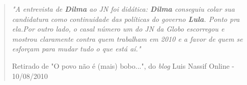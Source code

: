 \begin{quote}
\emph{"A entrevista de \textbf{Dilma} ao JN foi didática: \textbf{Dilma} conseguiu colar sua candidatura como continuidade das políticas do governo \textbf{Lula}. Ponto pra ela.Por outro lado, o casal número um do JN da Globo escorregou e mostrou claramente contra quem trabalham em 2010 e a favor de quem se esforçam para mudar tudo o que está aí."}

{\small Retirado de "O povo não é (mais) bobo...", do \emph{blog} Luis Nassif Online - 10/08/2010}
\end{quote}


